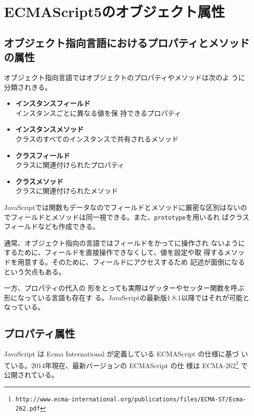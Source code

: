\section{ECMAScript5のオブジェクト属性}
\subsection{オブジェクト指向言語におけるプロパティとメソッドの属性}
オブジェクト指向言語ではオブジェクトのプロパティやメソッドは次のよ
うに分類されきる。
\begin{itemize}
 \item {\bfseries インスタンスフィールド}\\インスタンスごとに異なる値を保
       持できるプロパティ
 \item {\bfseries インスタンスメソッド}\\
クラスのすべてのインスタンスで共有されるメソッド
 \item {\bfseries クラスフィールド}\\クラスに関連付けられたプロパティ
 \item {\bfseries クラスメソッド}\\
クラスに関連付けられたメソッド
\end{itemize}
JavaScriptでは関数もデータなのでフィールドとメソッドに厳密な区別はないの
でフィールドとメソッドは同一視できる。また、\texttt{prototype}を用いるれ
ばクラスフィールドなども作成できる。

通常、オブジェクト指向の言語ではフィールドをかってに操作され
ないようにするために、フィールドを直接操作できなくして、値を設定や取
得するメソッドを用意する。そのために、フィールドにアクセスするため
記述が面倒になるという欠点もある。

一方、プロパティの代入の
形をとっても実際はゲッターやセッター関数を呼ぶ形になっている言語も存在す
る。JavaScriptの最新版1.8.1以降ではそれが可能となっている。
\subsection{プロパティ属性}
JavaScript は Ecma International が定義している ECMAScript の仕様に基づ
いている。2014年現在、最新バージョンの ECMAScript の仕
様は
ECMA-262\footnote{\texttt{http://www.ecma-international.org/publications/files/ECMA-ST/Ecma-262.pdf}}
で公開されている。

